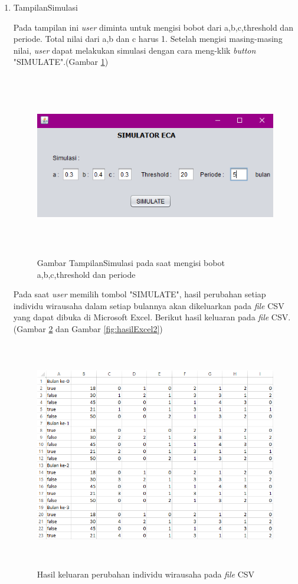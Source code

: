 \begin{enumerate}
	\item TampilanSimulasi
	
	Pada tampilan ini \textit{user} diminta untuk mengisi bobot dari a,b,c,threshold dan periode. Total nilai dari a,b dan c harus 1. Setelah mengisi masing-masing nilai, \textit{user} dapat melakukan simulasi dengan cara meng-klik \textit{button} "SIMULATE".(Gambar \ref{fig:tampilansimulasi})
	
		\begin{figure} [H]
	\centering  
	\includegraphics[width=14cm, height=8cm]{tampilanImplementasiSimulasi1} 
		\caption[Gambar TampilanSimulasi]{Gambar TampilanSimulasi pada saat mengisi bobot a,b,c,threshold dan periode}
	\label{fig:tampilansimulasi} 
\end{figure}

Pada saat \textit{user} memilih tombol "SIMULATE", hasil perubahan setiap individu wirausaha dalam setiap bulannya akan dikeluarkan pada \textit{file} CSV yang dapat dibuka di Microsoft Excel. Berikut hasil keluaran pada \textit{file} CSV. (Gambar \ref{fig:hasilExcel1} dan Gambar \ref{fig:hasilExcel2})

		\begin{figure} [H]
	\centering  
	\includegraphics[width=14cm, height=10cm]{hasilExcel1} 
		\caption[Hasil keluaran perubahan individu wirausaha pada \textit{file} CSV]{Hasil keluaran perubahan individu wirausaha pada \textit{file} CSV}
	\label{fig:hasilExcel1} 
\end{figure}


\end{enumerate}
